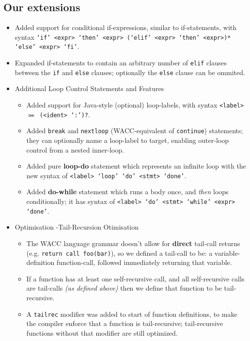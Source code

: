 \documentclass[11pt,a4paper]{article}
\begin{document}
\subsection{Our extensions}
\begin{itemize}[leftmargin=*]
  \item Added support for conditional if-expressions, similar to if-statements, with syntax \texttt{`if' <expr> `then' <expr> (`elif' <expr> `then' <expr>)* `else' <expr> `fi'}.
  \item Expanded if-statements to contain an arbitrary number of \texttt{elif} clauses between the \texttt{if} and \texttt{else} clauses; optionally the \texttt{else} clause can be ommited.
  \item {Additional Loop Control Statements and Features
    \begin{itemize}[leftmargin=*]
      \item Added support for Java-style (optional) loop-labels, with syntax \texttt{<label> $\Coloneqq$ (<ident> `:')?}.
      \item Added \texttt{break} and \texttt{nextloop} (WACC-equivalent of \texttt{continue}) statements; they can optionally name a loop-label to target, enabling outer-loop control from a nested inner-loop.
      \item Added pure \textbf{loop-do} statement which represents an infinite loop with the new syntax of \texttt{<label> `loop' `do' <stmt> `done'}.
      \item Added \textbf{do-while} statement which runs a body once, and \textit{then} loops conditionally; it has syntax of \texttt{<label> `do' <stmt> `while' <expr> `done'}.
    \end{itemize}}
  \item {Optimisation -Tail-Recursion Otimisation
    \begin{itemize}[leftmargin=*]
      \item The WACC language grammar doesn't allow for \textbf{direct} tail-call returns (e.g. \texttt{return call foo(bar)}), so we defined a tail-call to be: a variable-definition function-call, followed immediately returning that variable.
      \item If a function has at least one self-recursive call, and all self-recursive calls are tail-calls \textit{(as defined above)} then we define that function to be tail-recursive.
      \item A \texttt{tailrec} modifier was added to start of function definitions, to make the compiler enforce that a function is tail-recursive; tail-recursive functions without that modifier are still optimized.

\end{itemize}}
\end{itemize}
\end{document}
